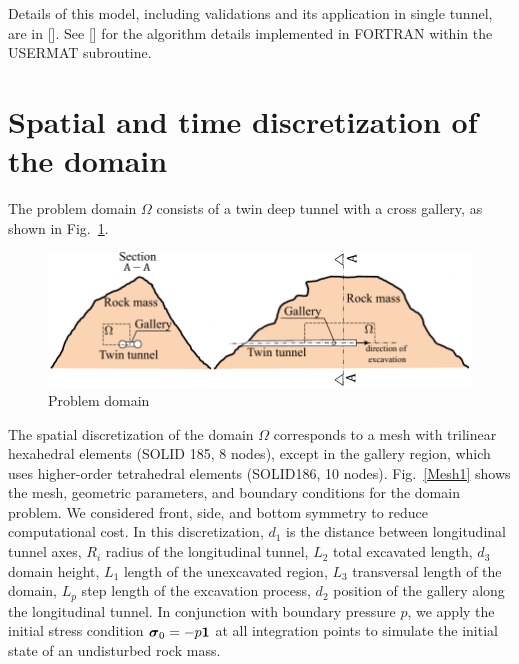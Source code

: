 \documentclass[a4paper,fleqn]{cas-sc}
\begin{document}
Details of this model, including validations and its application in single tunnel, are in []. See [] for the algorithm details implemented in FORTRAN within the USERMAT subroutine.


\section{Spatial and time discretization of the domain}\label{}

The problem domain $\Omega$ consists of a twin deep tunnel with a cross gallery, as shown in Fig.~\ref{domain}.
\begin{figure}[h!]
	\centering
	\includegraphics[scale=1]{Domain.pdf}
	\caption{Problem domain}
	\label{domain}
\end{figure}
\FloatBarrier
The spatial discretization of the domain $\Omega$ corresponds to a mesh with trilinear hexahedral elements (SOLID 185, 8 nodes), except in the gallery region, which uses higher-order tetrahedral elements (SOLID186, 10 nodes). Fig.~\ref{Mesh1} shows the mesh, geometric parameters, and boundary conditions for the domain problem. We considered front, side, and bottom symmetry to reduce computational cost. In this discretization, $d_1$ is the distance between longitudinal tunnel axes, $R_i$ radius of the longitudinal tunnel, $L_2$ total excavated length, $d_3$ domain height, $L_1$ length of the unexcavated region, $L_3$ transversal length of the domain, $L_p$ step length of the excavation process, $d_2$ position of the gallery along the longitudinal tunnel. In conjunction with boundary pressure $p$, we apply the initial stress condition $\boldsymbol{\sigma}_0 = -p\boldsymbol{1}$ at all integration points to simulate the initial state of an undisturbed rock mass. 
\end{document}
